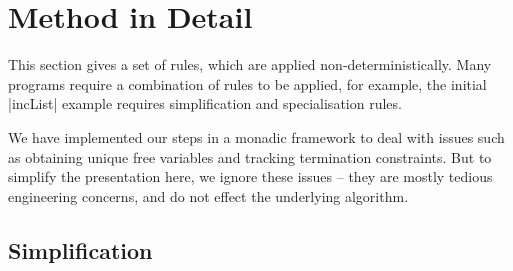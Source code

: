 \documentclass[preprint]{sigplanconf}
\begin{document}
\section{Method in Detail}
\label{sec:detailed}

\begin{comment}
\begin{code}
data Prog = Prog deriving Eq
simplify,arity,inline,specialise :: Prog -> Prog
\end{code}
\end{comment}

This section gives a set of rules, which are applied non-deterministically. Many programs require a combination of rules to be applied, for example, the initial |incList| example requires simplification and specialisation rules.

We have implemented our steps in a monadic framework to deal with issues such as obtaining unique free variables and tracking termination constraints. But to simplify the presentation here, we ignore these issues -- they are mostly tedious engineering concerns, and do not effect the underlying algorithm.

\subsection{Simplification}
\label{sec:simplification_detail}
\end{document}

